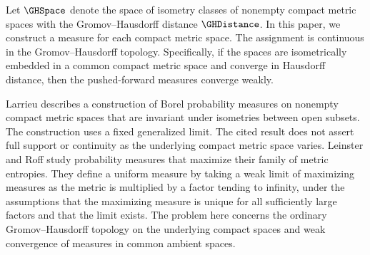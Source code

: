 Let
$\GHSpace$
denote the space of isometry classes of nonempty compact metric spaces
with the Gromov--Hausdorff distance
$\GHDistance$.
In this paper,
we construct a measure for each compact metric space.
The assignment is continuous in the Gromov--Hausdorff topology.
Specifically,
if the spaces are isometrically embedded in a common compact metric space
and converge in Hausdorff distance,
then the pushed-forward measures converge weakly.

Larrieu
\cite[arXiv v4, Theorem~3]{Larrieu2014InvariantProbabilities}
describes a construction of Borel probability measures on nonempty compact
metric spaces that are invariant under isometries between open subsets.
The construction uses a fixed generalized limit.
The cited result does not assert full support or continuity as the underlying
compact metric space varies.
Leinster and Roff
\cite[Theorem~1.1 and Definition~9.2]{LeinsterRoff2021Entropy}
study probability measures that maximize their family of metric entropies.
They define a uniform measure by taking a weak limit of maximizing measures
as the metric is multiplied by a factor tending to infinity,
under the assumptions that the maximizing measure is unique for all sufficiently
large factors and that the limit exists.
The  problem here concerns the ordinary Gromov--Hausdorff topology
on the underlying compact spaces and weak convergence of measures in
common ambient spaces.

